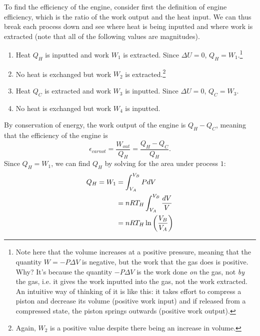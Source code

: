 \noindent To find the efficiency of the engine, consider first the definition of engine efficiency, which is the ratio of the work output and the heat input. We can thus break each process down and see where heat is being inputted and where work is extracted (note that all of the following values are magnitudes).
\begin{enumerate}
    \item Heat $Q_H$ is inputted and work $W_1$ is extracted. Since $\Delta U =0$, $Q_H = W_1$.\footnote{Note here that the volume increases at a positive pressure, meaning that the quantity $W = -P\Delta V$ is negative, but the work that the gas does is positive. Why? It's because the quantity $-P\Delta V$ is the work done \textit{on} the gas, not \textit{by} the gas, i.e. it gives the work inputted into the gas, not the work extracted. An intuitive way of thinking of it is like this: it takes effort to compress a piston and decrease its volume (positive work input) and if released from a compressed state, the piston springs outwards (positive work output).}
    \item No heat is exchanged but work $W_2$ is extracted.\footnote{Again, $W_2$ is a positive value despite there being an increase in volume.}
    \item Heat $Q_C$ is extracted and work $W_3$ is inputted. Since $\Delta U=0$, $Q_C = W_3$.
    \item No heat is exchanged but work $W_4$ is inputted.
\end{enumerate}
\noindent By conservation of energy, the work output of the engine is $Q_H - Q_C$, meaning that the efficiency of the engine is 
\begin{equation}
    \epsilon_{carnot} = \frac{W_{out}}{Q_H} = \frac{Q_H-Q_C}{Q_H}.
\end{equation}
\noindent Since $Q_H = W_1$, we can find $Q_H$ by solving for the area under process $1$:
\begin{align}
    Q_H = W_1 &= \int_{V_A}^{V_B}PdV \nonumber \\
    &= nRT_H\int_{V_A}^{V_B}\frac{dV}{V} \nonumber \\
    &= nRT_H\ln\left(\frac{V_B}{V_A}\right)
\end{align}
